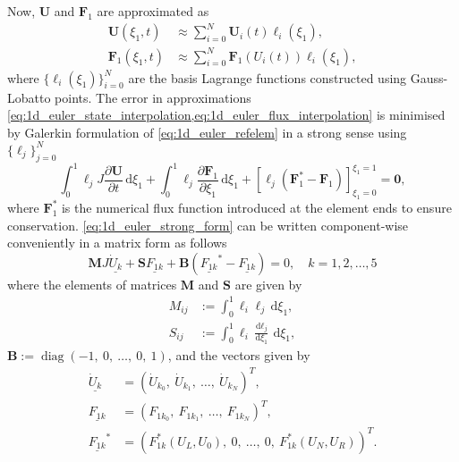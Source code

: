 \documentclass[a4paper,11pt,oneside]{article}
\newcommand{\vect}[1]{\ensuremath{\boldsymbol{\mathbf{#1}}}} %
\newcommand{\pder}[2]{\frac{\partial #1}{\partial #2}} %
\newcommand{\der}[2]{\frac{\sdd #1}{\sdd #2}}
\newcommand{\sdi}{\ensuremath{\,\text{d}}} %
\newcommand{\sdd}{\ensuremath{\text{d}}} %
\DeclareMathOperator{\diag}{diag} %
\newcommand{\defeq}{\ensuremath{:=}} %
\newcommand{\linalgmat}[1]{\vect{#1}} %
\newcommand{\linalgvect}[1]{\ensuremath{\underline{#1}}} %
\newcommand{\eulerref}[1]{\ensuremath{#1}} %
\begin{document}
Now, $\eulerref{\vect{U}}$ and $\eulerref{\vect{F}}_1$ are approximated as
\begin{align}
	\eulerref{\vect{U}}(\xi_1,t) &\approx \sum_{i=0}^{N} \eulerref{\vect{U}}_i(t) \ell_i(\xi_1),
	\label{eq:1d_euler_state_interpolation}\\
	\eulerref{\vect{F}}_1(\xi_1,t) &\approx \sum_{i=0}^{N} \eulerref{\vect{F}}_1(U_i(t)) \ell_i(\xi_1),
	\label{eq:1d_euler_flux_interpolation}
\end{align}
where $\{\ell_i(\xi_1)\}_{i=0}^{N}$ are the basis Lagrange functions constructed using Gauss-Lobatto points. The error in approximations \cref{eq:1d_euler_state_interpolation,eq:1d_euler_flux_interpolation} is minimised by Galerkin formulation of \cref{eq:1d_euler_refelem} in a strong sense using $\{\ell_j\}_{j=0}^{N}$
\begin{equation}
	\int_{0}^{1} \ell_j J \pder{\eulerref{\vect{U}}}{t} \sdi \xi_1 + \int_{0}^{1} \ell_j \pder{\eulerref{\vect{F}}_1}{\xi_1} \sdi \xi_1 + \left[\ell_j (\eulerref{\vect{F}}_1^*-\eulerref{\vect{F}}_1) \right]_{\xi_1=0}^{\xi_1=1} = \vect{0},
	\label{eq:1d_euler_strong_form}
\end{equation}
where $\eulerref{\vect{F}}_1^*$ is the numerical flux function introduced at the element ends to ensure conservation. \cref{eq:1d_euler_strong_form} can be written component-wise conveniently in a matrix form as follows
\begin{equation}
	\linalgmat{M} J \linalgvect{\dot{U}_k} + \linalgmat{S} {\linalgvect{F_{1k}}} + \linalgmat{B} \left( {\linalgvect{F_{1k}}^*} - {\linalgvect{F_{1k}}} \right) = 0, \quad k=1,2,\ldots,5
	\label{eq:1d_euler_matrix_form1}
\end{equation}
where the elements of matrices \linalgmat{M} and \linalgmat{S} are given by
\begin{align*}
	M_{ij} &\defeq \int_{0}^{1} \ell_i \ell_j \sdi \xi_1,\\
	S_{ij} &\defeq \int_{0}^{1} \ell_i \der{\ell_j}{\xi_1} \sdi \xi_1,
\end{align*}
$\linalgmat{B} \defeq \diag (-1,\ 0,\ \ldots,\ 0,\ 1)$, and the vectors given by
\begin{align*}
	\linalgvect{\dot{U}_k} &= ({\dot{U}_{k_0}},\ {\dot{U}_{k_1}},\ \ldots,\ {\dot{U}_{k_N}})^T,\\
	\linalgvect{F_{1k}} &= (F_{1k_0},\ F_{1k_1},\ \ldots,\ F_{1k_N})^T,\\
	\linalgvect{F_{1k}}^* &= \left(F_{1k}^*(U_L, U_0),\ 0,\ \ldots,\ 0,\ F_{1k}^*(U_N, U_R) \right)^T.
\end{align*}

\printbibliography
\end{document}
